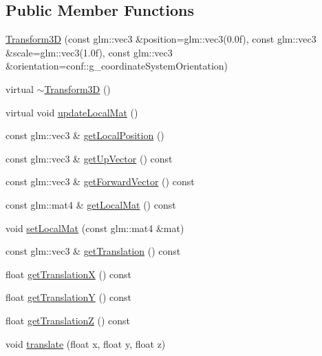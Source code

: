 \subsection*{Public Member Functions}
\begin{DoxyCompactItemize}
\item 
\mbox{\hyperlink{classec_1_1_transform3_d_adb5c661621922b1a3a6e6433ce1c79f6}{Transform3D}} (const glm\+::vec3 \&position=glm\+::vec3(0.\+0f), const glm\+::vec3 \&scale=glm\+::vec3(1.\+0f), const glm\+::vec3 \&orientation=conf\+::g\+\_\+coordinate\+System\+Orientation)
\item 
virtual \mbox{\hyperlink{classec_1_1_transform3_d_a1df4b7afcf78aef64719b2302cfac864}{$\sim$\+Transform3D}} ()
\item 
virtual void \mbox{\hyperlink{classec_1_1_transform3_d_a68d259da063ea2aff48720ae55870445}{update\+Local\+Mat}} ()
\item 
const glm\+::vec3 \& \mbox{\hyperlink{classec_1_1_transform3_d_a69ce5285f9481b5615c084b9f892fdb8}{get\+Local\+Position}} ()
\item 
const glm\+::vec3 \& \mbox{\hyperlink{classec_1_1_transform3_d_af8bdfb3bbc688a9a920ccb4d452d8962}{get\+Up\+Vector}} () const
\item 
const glm\+::vec3 \& \mbox{\hyperlink{classec_1_1_transform3_d_afc4f5c1122a5191ad2a4628a43a76a7c}{get\+Forward\+Vector}} () const
\item 
const glm\+::mat4 \& \mbox{\hyperlink{classec_1_1_transform3_d_a8aa0ac4df795971dad499a0d12348d07}{get\+Local\+Mat}} () const
\item 
void \mbox{\hyperlink{classec_1_1_transform3_d_a5cc1409f0c09910a701dcd294e797498}{set\+Local\+Mat}} (const glm\+::mat4 \&mat)
\item 
const glm\+::vec3 \& \mbox{\hyperlink{classec_1_1_transform3_d_a73b5f3bfbeb73eb4f445b1941b8e359d}{get\+Translation}} () const
\item 
float \mbox{\hyperlink{classec_1_1_transform3_d_ac0371b75ed67d59665967846d9cc6827}{get\+TranslationX}} () const
\item 
float \mbox{\hyperlink{classec_1_1_transform3_d_a18d2aca82a3b8944815801963f32ab8c}{get\+TranslationY}} () const
\item 
float \mbox{\hyperlink{classec_1_1_transform3_d_a5d7ec019acf68cb930db1a7db79ef97f}{get\+TranslationZ}} () const
\item 
void \mbox{\hyperlink{classec_1_1_transform3_d_a9c143bdc0bf020940b9b6bd7e2a01d45}{translate}} (float x, float y, float z)
\item 

\end{DoxyCompactItemize}
